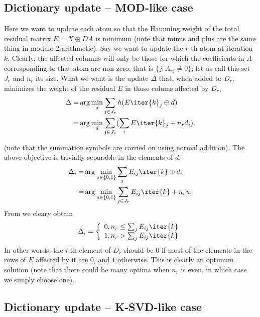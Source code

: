\documentclass[a4paper,11pt]{article}
\begin{document}
 \subsection{Dictionary update -- MOD-like case}
 
Here we want to update each atom so that the Hamming weight of the total residual matrix $E = X \oplus DA$ is minimum (note that minus and plus are the same thing in modulo-2 arithmetic). Say we want to update the $r$-th atom at iteration $k$. Clearly, the affected columns will only be those for which the  coefficients in $A$  corresponding to that atom are non-zero, that is $\{j : A_{rj} \neq 0 \}$; let us call this set $J_r$ and $n_r$ its size. What we want is the update $\Delta$ that, when added to $D_r$, minimizes the weight of the residual $E$ in those colums affected by $D_r$,
 \begin{eqnarray}
 \Delta  =& \arg\min_d \sum_{j \in J_r}  h(E\iter{k}_j \oplus d) \\
 =& \arg\min_d \sum_{j \in J_r} (\sum_i E\iter{k}_j + n_r d_i).
\label{eq:bdu2}
 \end{eqnarray}

(note that the summation symbols are carried on using normal addition). The above objective is trivially separable in the elements of $d$,
 \begin{eqnarray}
 \Delta_i  =& \arg\min_{u \in \{0,1\}} \sum_j E_{ij}\iter{k} \oplus d_i\\
 =& \arg\min_{u \in \{0,1\}} \sum_{j\in J_r} E_{ij}\iter{k} + n_r u.
\label{eq:bdu3}
 \end{eqnarray}
From  we cleary obtain 
\begin{equation}
\Delta_i = \left\{
\begin{array}{cl}
0, n_r \leq  \sum_j E_{ij}\iter{k} \\
1, n_r > \sum_j E_{ij}\iter{k}
\end{array}
\right. 
\label{eq:bdu4}
\end{equation}
In other words, the $i$-th element of $D_r$ should be $0$ if most of the elements in the rows of $E$ affected by it are $0$, and $1$ otherwise. 
This is clearly an optimum solution (note that there could be many optima  when $n_r$ is even, in which case we simply choose one).

\subsection{Dictionary update -- K-SVD-like case}
\end{document}
